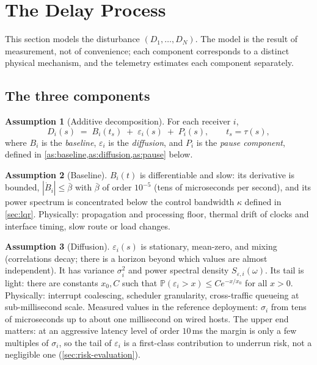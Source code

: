 \documentclass[11pt, a4paper]{article}
\theoremstyle{definition}
\newtheorem{assumption}{Assumption}[section]
\theoremstyle{plain}
\theoremstyle{remark}
\newcommand{\Prob}{\mathbb{P}}
\begin{document}
\section{The Delay Process}\label{sec:process}

This section models the disturbance $(D_1, \dots, D_N)$.  The model is the
result of measurement, not of convenience; each component corresponds to a
distinct physical mechanism, and the telemetry estimates each component
separately.

\subsection{The three components}\label{sec:components}

\begin{assumption}[Additive decomposition]\label{as:decomposition}
For each receiver $i$,
\begin{equation}\label{eq:decomposition}
  D_i(s) \;=\; B_i(t_s) \;+\; \varepsilon_i(s) \;+\; P_i(s),
  \qquad t_s = \tau(s),
\end{equation}
where $B_i$ is the \emph{baseline}, $\varepsilon_i$ is the
\emph{diffusion}, and $P_i$ is the \emph{pause component}, defined in
\cref{as:baseline,as:diffusion,as:pause} below.
\end{assumption}

\begin{assumption}[Baseline]\label{as:baseline}
$B_i(t)$ is differentiable and slow: its derivative is bounded,
$|\dot B_i| \le \bar\beta$ with $\bar\beta$ of order $10^{-5}$ (tens of
microseconds per second), and its power spectrum is concentrated below the
control bandwidth $\kappa$ defined in \cref{sec:lqr}.  Physically:
propagation and processing floor, thermal drift of clocks and interface
timing, slow route or load changes.
\end{assumption}

\begin{assumption}[Diffusion]\label{as:diffusion}
$\varepsilon_i(s)$ is stationary, mean-zero, and mixing (correlations
decay; there is a horizon beyond which values are almost independent).
It has variance $\sigma_i^2$ and power spectral density $S_{\varepsilon,i}(\omega)$.
Its tail is light: there are constants $x_0, C$ such that
$\Prob(\varepsilon_i > x) \le C e^{-x/x_0}$ for all $x>0$.  Physically:
interrupt coalescing, scheduler granularity, cross-traffic queueing at
sub-millisecond scale.  Measured values in the reference deployment:
$\sigma_i$ from tens of microseconds up to about one millisecond on wired
hosts.  The upper end matters: at an aggressive latency level of order
$10$\,ms the margin is only a few multiples of $\sigma_i$, so the tail of
$\varepsilon_i$ is a first-class contribution to underrun risk, not a
negligible one (\cref{sec:risk-evaluation}).
\end{assumption}
\end{document}
